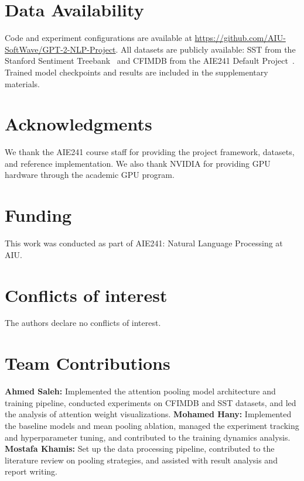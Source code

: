 \documentclass[9pt,twocolumn,twoside,lineno]{gsag3jnl}
\begin{document}
\section{Data Availability}

Code and experiment configurations are available at \url{https://github.com/AIU-SoftWave/GPT-2-NLP-Project}. All datasets are publicly available: SST from the Stanford Sentiment Treebank~\citep{socher2013recursive} and CFIMDB from the AIE241 Default Project~\citep{cs224n2024}. Trained model checkpoints and results are included in the supplementary materials.

\section{Acknowledgments}

We thank the AIE241 course staff for providing the project framework, datasets, and reference implementation. We also thank NVIDIA for providing GPU hardware through the academic GPU program.

\section{Funding}

This work was conducted as part of AIE241: Natural Language Processing at AIU.

\section{Conflicts of interest}

The authors declare no conflicts of interest.

\section{Team Contributions}

\textbf{Ahmed Saleh:} Implemented the attention pooling model architecture and training pipeline, conducted experiments on CFIMDB and SST datasets, and led the analysis of attention weight visualizations. \textbf{Mohamed Hany:} Implemented the baseline models and mean pooling ablation, managed the experiment tracking and hyperparameter tuning, and contributed to the training dynamics analysis. \textbf{Mostafa Khamis:} Set up the data processing pipeline, contributed to the literature review on pooling strategies, and assisted with result analysis and report writing.


\end{document}
